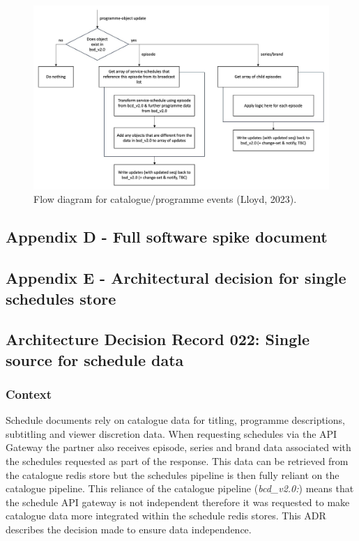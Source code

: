     \begin{figure}[H]
      \centering
      \includegraphics[width=12cm]{assets/initialDesign/programmeUpdate.jpg}
      \caption{Flow diagram for catalogue/programme events (Lloyd, 2023).}
      \label{fig:initialDesignProgrammes}
    \end{figure}

  
  \newpage
  \subsection{Appendix D - Full software spike document}
    \label{sec:AppendixD}
    

  \newpage
  \subsection{Appendix E - Architectural decision for single schedules store}
  \label{sec:AppendixE}

  \subsection*{Architecture Decision Record 022: Single source for schedule data}

  \subsubsection*{Context}
  Schedule documents rely on catalogue data for titling, programme descriptions, subtitling and viewer discretion data. When requesting 
  schedules via the API Gateway the partner also receives episode, series and brand data associated with the schedules requested as part of
  the response. This data can be retrieved from the catalogue redis store but the schedules pipeline is then fully reliant on the catalogue pipeline.
  This reliance of the catalogue pipeline (\emph{{bcd\_v2.0}:}) means that the schedule API gateway is not independent therefore it was requested to make 
  catalogue data more integrated within the schedule redis stores. This ADR describes the decision made to ensure data independence.
